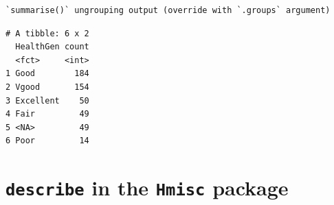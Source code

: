 \documentclass[
]{book}
\newenvironment{Shaded}{\begin{snugshade}}{\end{snugshade}}
\newcommand{\DataTypeTok}[1]{\textcolor[rgb]{0.13,0.29,0.53}{#1}}
\newcommand{\KeywordTok}[1]{\textcolor[rgb]{0.13,0.29,0.53}{\textbf{#1}}}
\newcommand{\NormalTok}[1]{#1}
\newcommand{\OperatorTok}[1]{\textcolor[rgb]{0.81,0.36,0.00}{\textbf{#1}}}
\newcommand{\StringTok}[1]{\textcolor[rgb]{0.31,0.60,0.02}{#1}}
\begin{document}
\begin{Shaded}
\end{Shaded}

\begin{verbatim}
`summarise()` ungrouping output (override with `.groups` argument)
\end{verbatim}

\begin{verbatim}
# A tibble: 6 x 2
  HealthGen count
  <fct>     <int>
1 Good        184
2 Vgood       154
3 Excellent    50
4 Fair         49
5 <NA>         49
6 Poor         14
\end{verbatim}

\hypertarget{describe-in-the-hmisc-package}{%
\section{\texorpdfstring{\texttt{describe} in the \texttt{Hmisc} package}{describe in the Hmisc package}}\label{describe-in-the-hmisc-package}}

\begin{Shaded}
\end{Shaded}
\end{document}
